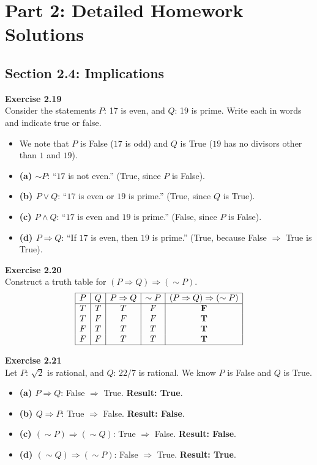 \documentclass[11pt]{article}
\begin{document}
\newpage
\section{Part 2: Detailed Homework Solutions}

\subsection{Section 2.4: Implications}

\textbf{Exercise 2.19} \\
Consider the statements $P$: 17 is even, and $Q$: 19 is prime. Write each in words and indicate true or false.
\begin{itemize}
    \item We note that $P$ is False ($17$ is odd) and $Q$ is True ($19$ has no divisors other than $1$ and $19$).
    \item \textbf{(a) $\sim P$}: ``$17$ is not even.'' (True, since $P$ is False).
    \item \textbf{(b) $P \vee Q$}: ``$17$ is even or $19$ is prime.'' (True, since $Q$ is True).
    \item \textbf{(c) $P \wedge Q$}: ``$17$ is even and $19$ is prime.'' (False, since $P$ is False).
    \item \textbf{(d) $P \Rightarrow Q$}: ``If $17$ is even, then $19$ is prime.'' (True, because False $\Rightarrow$ True is True).
\end{itemize}

\vspace{10pt}
\textbf{Exercise 2.20} \\
Construct a truth table for $(P \Rightarrow Q) \Rightarrow (\sim P)$.
\[
\begin{array}{|c|c|c|c|c|}
\hline
P & Q & P \Rightarrow Q & \sim P & (P \Rightarrow Q) \Rightarrow (\sim P) \\
\hline
T & T & T & F & \textbf{F} \\
T & F & F & F & \textbf{T} \\
F & T & T & T & \textbf{T} \\
F & F & T & T & \textbf{T} \\
\hline
\end{array}
\]

\vspace{10pt}
\textbf{Exercise 2.21} \\
Let $P$: $\sqrt{2}$ is rational, and $Q$: $22/7$ is rational. We know $P$ is False and $Q$ is True.
\begin{itemize}
    \item \textbf{(a) $P \Rightarrow Q$}: False $\Rightarrow$ True. \textbf{Result: True}.
    \item \textbf{(b) $Q \Rightarrow P$}: True $\Rightarrow$ False. \textbf{Result: False}.
    \item \textbf{(c) $(\sim P) \Rightarrow (\sim Q)$}: True $\Rightarrow$ False. \textbf{Result: False}.
    \item \textbf{(d) $(\sim Q) \Rightarrow (\sim P)$}: False $\Rightarrow$ True. \textbf{Result: True}.
\end{itemize}
\end{document}
